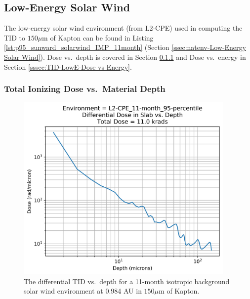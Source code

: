\documentclass{hitec}
\begin{document}
\clearpage %

\subsection{Low-Energy Solar Wind}
\label{ssec:TID-Low-Energy Solar Wind}

The low-energy solar wind environment (from L2-CPE) used in computing the TID to $150 \mu$m of Kapton can be found in Listing \ref{lst:p95_sunward_solarwind_IMP_11month} (Section \ref{ssec:natenv-Low-Energy Solar Wind}).  Dose vs.\ depth is covered in Section \ref{sssec:TID-LowE-Dose vs Depth} and Dose vs.\ energy in Section \ref{sssec:TID-LowE-Dose vs Energy}.

\subsubsection{Total Ionizing Dose vs.\ Material Depth}
\label{sssec:TID-LowE-Dose vs Depth}

\begin{figure}[htbp!]
	\centering
	\includegraphics[width=0.95\textwidth]{../L2-CPE_11-month_95-percentile_Differential_Dose_vs_Depth.png}
	\caption{The differential TID vs.\ depth for a 11-month isotropic background solar wind environment at 0.984 AU in $150 \mu$m of Kapton.}\label{fig:L2-CPE_11-month_95-percentile_Differential_Dose_vs_Depth}
\end{figure}
\end{document}
